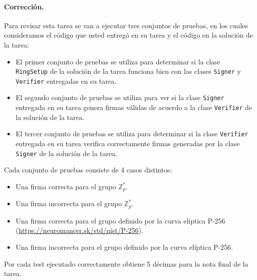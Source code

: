 \medskip

\paragraph{Corrección.} Para revisar esta tarea se van a ejecutar tres conjuntos de pruebas, en los cuales consideramos el código que usted entregó en su tarea y el código en la solución de la tarea:
\begin{itemize}
\item El primer conjunto de pruebas se utiliza para determinar si la clase \texttt{RingSetup} de la solución de la tarea funciona bien con las clases \texttt{Signer} y \texttt{Verifier} entregadas en su tarea.

\item El segundo conjunto de pruebas se utiliza para ver si la clase \texttt{Signer} entregada en su tarea genera firmas válidas de acuerdo a la clase \texttt{Verifier} de la solución de la tarea.

\item El tercer conjunto de pruebas se utiliza para determinar si la clase \texttt{Verifier} entregada en su tarea verifica correctamente firmas generadas por la clase \texttt{Signer} de la solución de la tarea.
\end{itemize}
Cada conjunto de pruebas consiste de 4 casos distintos:
\begin{itemize}
\item Una firma correcta para el grupo $\mathbb{Z}_p^*$.
\item Una firma incorrecta para el grupo $\mathbb{Z}_p^*$.

\item \begin{sloppypar} Una firma correcta para el grupo definido por la curva elíptica P-256 (\url{https://neuromancer.sk/std/nist/P-256}). \end{sloppypar}
\item Una firma incorrecta para el grupo definido por la curva elíptica P-256.
\end{itemize}
Por cada test ejecutado correctamente obtiene 5 décimas para la nota final de la tarea.
